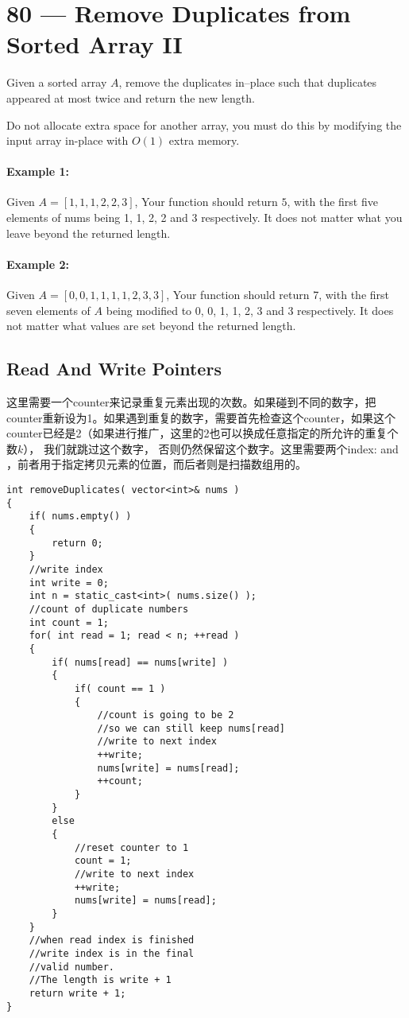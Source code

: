 \section{80 --- Remove Duplicates from Sorted Array II}
Given a sorted array $A$, remove the duplicates in--place such that duplicates appeared at most twice and return the new length.
\par
Do not allocate extra space for another array, you must do this by modifying the input array in-place with $O(1)$ extra memory.
\paragraph{Example 1:}
\begin{flushleft}
Given $A = [1,1,1,2,2,3]$, Your function should return $5$, with the first five elements of nums being 1, 1, 2, 2 and 3 respectively. It does not matter what you leave beyond the returned length.
\end{flushleft}
\paragraph{Example 2:}
\begin{flushleft}
Given $A = [0,0,1,1,1,1,2,3,3]$, Your function should return 7, with the first seven elements of $A$ being modified to 0, 0, 1, 1, 2, 3 and 3 respectively. It does not matter what values are set beyond the returned length.
\end{flushleft}
\subsection{Read And Write Pointers}
这里需要一个counter来记录重复元素出现的次数。如果碰到不同的数字，把counter重新设为1。如果遇到重复的数字，需要首先检查这个counter，如果这个counter已经是2（如果进行推广，这里的2也可以换成任意指定的所允许的重复个数$k$）， 我们就跳过这个数字， 否则仍然保留这个数字。这里需要两个index: and ，前者用于指定拷贝元素的位置，而后者则是扫描数组用的。

\setcounter{lstlisting}{0}
\begin{lstlisting}[style=customc, caption={Read And Write Pointers}]
int removeDuplicates( vector<int>& nums )
{
    if( nums.empty() )
    {
        return 0;
    }
    //write index
    int write = 0;
    int n = static_cast<int>( nums.size() );
    //count of duplicate numbers
    int count = 1;
    for( int read = 1; read < n; ++read )
    {
        if( nums[read] == nums[write] )
        {
            if( count == 1 )
            {
                //count is going to be 2
                //so we can still keep nums[read]
                //write to next index
                ++write;
                nums[write] = nums[read];
                ++count;
            }
        }
        else
        {
            //reset counter to 1
            count = 1;
            //write to next index
            ++write;
            nums[write] = nums[read];
        }
    }
    //when read index is finished
    //write index is in the final
    //valid number.
    //The length is write + 1
    return write + 1;
}
\end{lstlisting}
